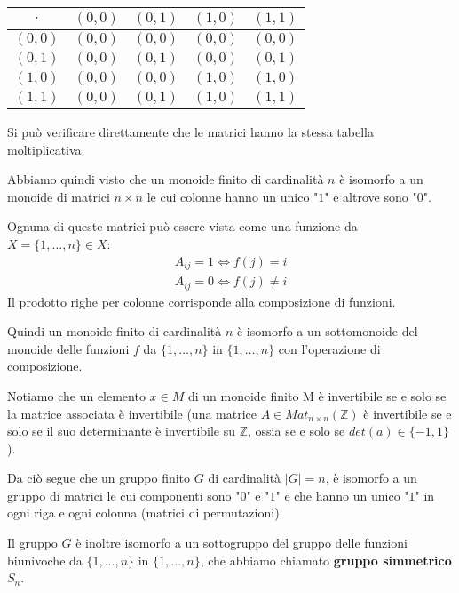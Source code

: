 \documentclass[../main.tex]{subfiles}
\begin{document}
\begin{example}
    \vspace*{1em}
    \begin{center}
        \begin{tabular}{c|c|c|c|c}
            $\cdot$ & $(0,0)$ & $(0,1)$ & $(1,0)$ & $(1,1)$ \\ \hline
            $(0,0)$ & $(0,0)$ & $(0,0)$ & $(0,0)$ & $(0,0)$ \\ \hline
            $(0,1)$ & $(0,0)$ & $(0,1)$ & $(0,0)$ & $(0,1)$ \\ \hline
            $(1,0)$ & $(0,0)$ & $(0,0)$ & $(1,0)$ & $(1,0)$ \\ \hline
            $(1,1)$ & $(0,0)$ & $(0,1)$ & $(1,0)$ & $(1,1)$ \\
        \end{tabular}
    \end{center}
    \vspace*{1em}
    Si può verificare direttamente che le matrici hanno la stessa tabella moltiplicativa.
\end{example}

Abbiamo quindi visto che un monoide finito di cardinalità $n$ è isomorfo a un monoide di matrici $n \times n$ le cui colonne hanno un unico "$1$" e altrove sono "$0$".

Ognuna di queste matrici può essere vista come una funzione da $X = \{1,\ldots,n\} \in X$:
\begin{gather*}
    A_{ij} = 1 \iff f(j) = i\\
    A_{ij} = 0 \iff f(j) \neq i
\end{gather*}
Il prodotto righe per colonne corrisponde alla composizione di funzioni.

Quindi un monoide finito di cardinalità $n$ è isomorfo a un sottomonoide del monoide delle funzioni $f$ da $\{1,\ldots,n\}$ in $\{1,\ldots,n\}$ con l'operazione di composizione.

Notiamo che un elemento $x \in M$ di un monoide finito M è invertibile se e solo se la matrice associata è invertibile (una matrice $A \in Mat_{n \times n} (\mathbb{Z})$ è invertibile se e solo se il suo determinante è invertibile su $\mathbb{Z}$, ossia se e solo se $det(a) \in \{-1,1\}$).

Da ciò segue che un gruppo finito $G$ di cardinalità $|G|=n$, è isomorfo a un gruppo di matrici le cui componenti sono "$0$" e "$1$" e che hanno un unico "$1$" in ogni riga e ogni colonna (matrici di permutazioni).

Il gruppo $G$ è inoltre isomorfo a un sottogruppo del gruppo delle funzioni biunivoche da $\{1,\ldots,n\}$ in $\{1,\ldots,n\}$, che abbiamo chiamato \textbf{gruppo simmetrico $S_n$}.
\end{document}
